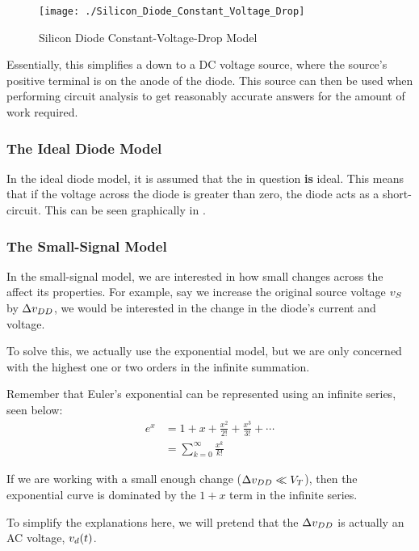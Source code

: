 \begin{figure}[h!tbp]
  \centering
  \texttt{[image: ./Silicon\_Diode\_Constant\_Voltage\_Drop]}
  \caption{Silicon Diode Constant-Voltage-Drop Model \parencite[p.~193]{sedraTextbook7}}
  \label{fig:Silicon_Diode_Constant_Voltage_Drop}
\end{figure}

Essentially, this simplifies a  down to a DC voltage source, where the source's positive terminal is on the anode of the diode.
This source can then be used when performing circuit analysis to get reasonably accurate answers for the amount of work required.

\subsubsection{The Ideal Diode Model}\label{subsubsec:Ideal_Diode_Model}
In the ideal diode model, it is assumed that the  in question \textbf{is} ideal.
This means that if the voltage across the diode is greater than zero, the diode acts as a short-circuit.
This can be seen graphically in .

\subsubsection{The Small-Signal Model}\label{subsubsec:Diode_Small-Signal_Model}
In the small-signal model, we are interested in how small changes across the  affect its properties.
For example, say we increase the original source voltage $v_{S}$ by $\Delta v_{DD}$, we would be interested in the change in the diode's current and voltage.

To solve this, we actually use the exponential model, but we are only concerned with the highest one or two orders in the infinite summation.

\begin{blackbox}
  Remember that Euler's exponential can be represented using an infinite series, seen below:
  \begin{align*}
    e^{x} &= 1 + x + \frac{x^{2}}{2!} + \frac{x^{3}}{3!} + \cdots \\
    &= \sum\limits_{k = 0}^{\infty} \frac{x^{k}}{k!}
  \end{align*}
\end{blackbox}

If we are working with a small enough change ($\Delta v_{DD} \ll V_{T}$), then the exponential curve is dominated by the $1+x$ term in the infinite series.

To simplify the explanations here, we will pretend that the $\Delta v_{DD}$ is actually an AC voltage, $v_{d}(t)$.


